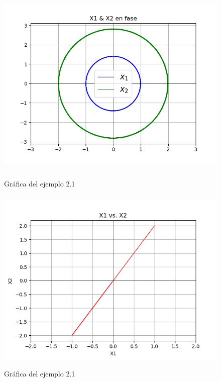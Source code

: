 \begin{figure}[h!]
	\begin{center}
        \includegraphics[height=9cm]{Ejem2_1-GrafB}
        \caption{Gráfica del ejemplo 2.1}

        \includegraphics[height=9cm]{Ejem2_1-GrafC}
        \caption{Gráfica del ejemplo 2.1}
    \end{center}
\end{figure}

